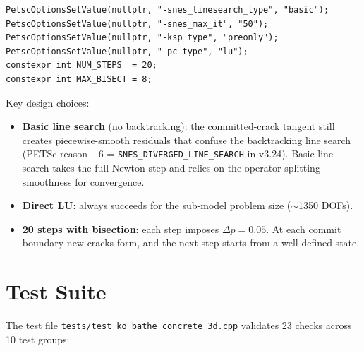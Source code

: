 \begin{lstlisting}
PetscOptionsSetValue(nullptr, "-snes_linesearch_type", "basic");
PetscOptionsSetValue(nullptr, "-snes_max_it", "50");
PetscOptionsSetValue(nullptr, "-ksp_type", "preonly");
PetscOptionsSetValue(nullptr, "-pc_type", "lu");
constexpr int NUM_STEPS  = 20;
constexpr int MAX_BISECT = 8;
\end{lstlisting}

Key design choices:

\begin{itemize}
  \item \textbf{Basic line search} (no backtracking): the committed-crack
        tangent still creates piecewise-smooth residuals that confuse
        the backtracking line search (PETSc reason $-6$ =
        \texttt{SNES\_DIVERGED\_LINE\_SEARCH} in v3.24).  Basic line search
        takes the full Newton step and relies on the operator-splitting
        smoothness for convergence.
  \item \textbf{Direct LU}: always succeeds for the sub-model problem
        size ($\sim$1350 DOFs).
  \item \textbf{20 steps with bisection}: each step imposes $\Delta p = 0.05$.
        At each commit boundary new cracks form, and the next step starts
        from a well-defined state.
\end{itemize}


\section{Test Suite}
\label{sec:kb3d-tests}

The test file \texttt{tests/test\_ko\_bathe\_concrete\_3d.cpp} validates 23
checks across 10 test groups:

